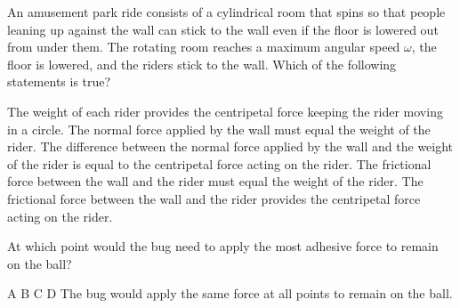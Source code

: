\documentclass{../../../oss-apphys-exam}
\begin{document}
\begin{questions}
    
  \question An amusement park ride consists of a cylindrical room that spins so
  that people leaning up against the wall can stick to the wall even if the
  floor is lowered out from under them. The rotating room reaches a maximum
  angular speed $\omega$, the floor is lowered, and the riders stick to the
  wall. Which of the following statements is true?
  \begin{choices}
    \choice The weight of each rider provides the centripetal force keeping the
    rider moving in a circle.
    \choice The normal force applied by the wall must equal the weight of the
    rider.
    \choice The difference between the normal force applied by the wall and the
    weight of the rider is equal to the centripetal force acting on the rider.
    \choice The frictional force between the wall and the rider must equal the
    weight of the rider.
    \choice The frictional force between the wall and the rider provides the
    centripetal force acting on the rider.
  \end{choices}
    
  
  \question At which point would the bug need to apply the most adhesive force
  to remain on the ball?
  \begin{choices}
    \choice A
    \choice B
    \choice C
    \choice D
    \choice The bug would apply the same force at all points to remain on the
    ball.
  \end{choices}
  \label{bug1}
   

\end{questions}
\end{document}
